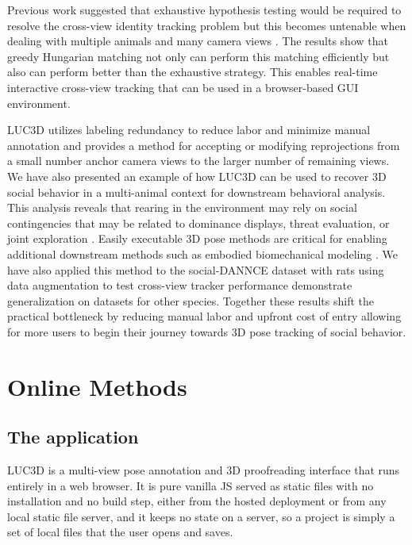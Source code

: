 \documentclass[pdflatex, sn-nature]{sn-jnl}
\theoremstyle{thmstyleone}%
\theoremstyle{thmstyletwo}%
\theoremstyle{thmstylethree}%
\begin{document}
Previous work suggested that exhaustive hypothesis testing would be required to resolve the cross-view identity tracking problem but this becomes untenable when dealing with multiple animals and many camera views \citep{Maree2024}. The results show that greedy Hungarian matching not only can perform this matching efficiently but also can perform better than the exhaustive strategy. This enables real-time interactive cross-view tracking that can be used in a browser-based GUI environment. 

LUC3D utilizes labeling redundancy to reduce labor and minimize manual annotation and provides a method for accepting or modifying reprojections from a small number anchor camera views to the larger number of remaining views. We have also presented an example of how LUC3D can be used to recover 3D social behavior in a multi-animal context for downstream behavioral analysis. This analysis reveals that rearing in the environment may rely on social contingencies that may be related to dominance displays, threat evaluation, or joint exploration \citep{Lever2006, Leonardis2022}. Easily executable 3D pose methods are critical for enabling additional downstream methods such as embodied biomechanical modeling \citep{Leonardis2025,Zhang2025}. We have also applied this method to the social-DANNCE dataset with rats using data augmentation to test cross-view tracker performance demonstrate generalization on datasets for other species. Together these results shift the practical bottleneck by reducing manual labor and upfront cost of entry allowing for more users to begin their journey towards 3D pose tracking of social behavior. 

\section{Online Methods}\label{sec4}

\subsection{The application}\label{methods-app}

LUC3D is a multi-view pose annotation and 3D proofreading interface that runs entirely in a web browser. It is pure vanilla JS served as static files with no installation and no build step, either from the hosted deployment or from any local static file server, and it keeps no state on a server, so a project is simply a set of local files that the user opens and saves.
\end{document}
